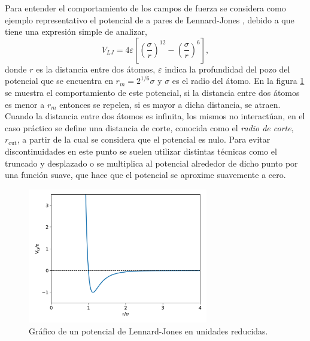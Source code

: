 Para entender el comportamiento de los campos de fuerza se considera como ejemplo 
representativo el potencial de a pares de Lennard-Jones \cite{lennard-jones}, 
debido a que tiene una expresión simple de analizar,
\begin{equation}
    V_{LJ} = 4\varepsilon \left[ \left( \frac{\sigma}{r} \right)^{12} - \left( \frac{\sigma}{r} \right)^{6} \right],
\end{equation}
donde $r$ es la distancia entre dos átomos, $\varepsilon$ indica la profundidad 
del pozo del potencial que se encuentra en $r_m = 2^{1/6} \sigma$ y $\sigma$ es el
radio del átomo. En la figura \ref{fig:lj} se muestra el comportamiento de este
potencial, si la distancia entre dos átomos es menor a $r_m$ entonces se repelen,
si es mayor a dicha distancia, se atraen. Cuando la distancia entre dos átomos es 
infinita, los mismos no interactúan, en el caso práctico se define una distancia 
de corte, conocida como el \textit{radio de corte}, $r_{\text{cut}}$, a partir de 
la cual se considera que el potencial es nulo. Para evitar discontinuidades en 
este punto se suelen utilizar distintas técnicas como el truncado y desplazado o 
se multiplica al potencial alrededor de dicho punto por una función suave, que 
hace que el potencial se aproxime suavemente a cero.
\begin{figure}[h!]
    \centering
    \includegraphics[width=0.7\textwidth]{Metodos/atomicos/lj.png}
    \caption{Gráfico de un potencial de Lennard-Jones en unidades reducidas.}
    \label{fig:lj}
\end{figure}

